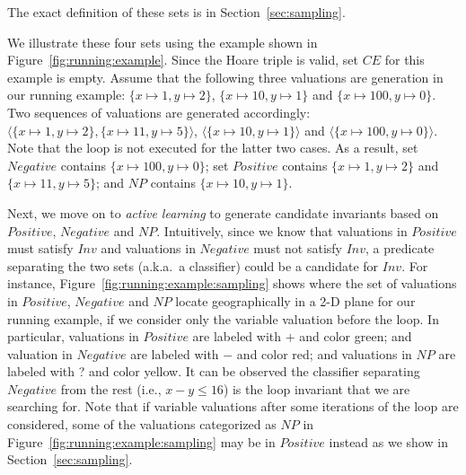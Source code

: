 The exact definition of these sets is in Section~\ref{sec:sampling}.
%
%
\begin{example}
We illustrate these four sets using the example shown in Figure~\ref{fig:running:example}. Since the Hoare triple is valid, set $CE$ for this example is empty. 
Assume that the following three valuations are generation in our running example: $\{x \mapsto 1, y \mapsto 2\}$, $\{x \mapsto 10, y \mapsto 1\}$ and $\{x \mapsto 100, y \mapsto 0\}$. Two sequences of valuations are generated accordingly: $\langle \{x \mapsto 1, y \mapsto 2\}, \{x \mapsto 11, y \mapsto 5\} \rangle$, $\langle \{x \mapsto 10, y \mapsto 1\} \rangle$ and $\langle \{x \mapsto 100, y \mapsto 0\} \rangle$. Note that the loop is not executed for the latter two cases. As a result, set $\mathit{Negative}$ contains $\{x \mapsto 100, y \mapsto 0\}$; set $\mathit{Positive}$ contains $\{x \mapsto 1, y \mapsto 2\}$ and $\{x \mapsto 11, y \mapsto 5\}$; and $\mathit{NP}$ contains $\{x \mapsto 10, y \mapsto 1\}$.
\end{example}
Next, we move on to \emph{active learning} to generate candidate invariants based on $\mathit{Positive}$, $\mathit{Negative}$ and $\mathit{NP}$. Intuitively, since we know that valuations in $\mathit{Positive}$ must satisfy $\mathit{Inv}$ and valuations in $\mathit{Negative}$ must not satisfy $\mathit{Inv}$, a predicate separating the two sets (a.k.a.~a classifier) could be a candidate for $\mathit{Inv}$.
For instance, Figure~\ref{fig:running:example:sampling} shows where the set of valuations in $\mathit{Positive}$, $\mathit{Negative}$ and $\mathit{NP}$ locate geographically in a 2-D plane for our running example, if we consider only the variable valuation before the loop. In particular, valuations in $\mathit{Positive}$ are labeled with $+$ and color green; and valuation in $\mathit{Negative}$ are labeled with $-$ and color red; and valuations in $\mathit{NP}$ are labeled with ? and color yellow. It can be observed the classifier separating $\mathit{Negative}$ from the rest (i.e., $x - y \leq 16$) is the loop invariant that we are searching for. Note that if variable valuations after some iterations of the loop are considered, some of the valuations categorized as $NP$ in Figure~\ref{fig:running:example:sampling} may be in $Positive$ instead as we show in Section~\ref{sec:sampling}.


